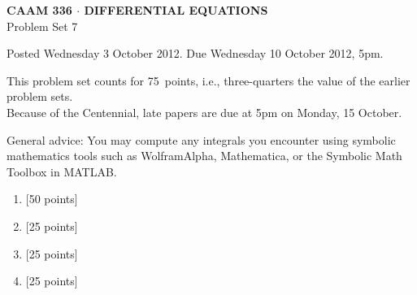 \documentclass[10pt]{article}
\begin{document}

\begin{center}
\large \textsf{\textbf{CAAM 336 $\cdot$ DIFFERENTIAL EQUATIONS}\\[0.5em]
 Problem Set 7 }
\end{center}

Posted Wednesday 3 October 2012.  Due Wednesday 10 October 2012, 5pm.



\begin{center}
This problem set counts for 75~points, i.e., three-quarters the value 
of the earlier problem sets.\\
Because of the Centennial, late papers are due at 5pm on Monday, 15 October.
\end{center}

General advice: You may compute any integrals you encounter using symbolic mathematics 
tools such as WolframAlpha, Mathematica, or the Symbolic Math Toolbox in MATLAB.


\begin{enumerate}
\item {[50 points]}\\  

\vspace*{1em}
\item {[25 points]}\\  

\item {[25 points]}\\  

\item {[25 points]}\\  

\end{enumerate}
\end{document}
